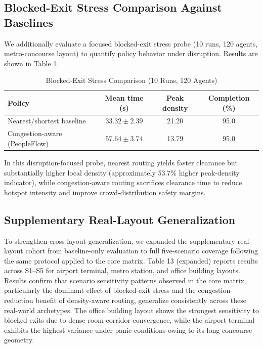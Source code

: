 \documentclass[journal]{IEEEtran}
\begin{document}
\subsection{Blocked-Exit Stress Comparison Against Baselines}
We additionally evaluate a focused blocked-exit stress probe (10 runs, 120 agents, metro-concourse layout) to quantify policy behavior under disruption. Results are shown in Table \ref{tab:blocked_policy_comparison}.

\begin{table}[!htbp]
\centering
\caption{Blocked-Exit Stress Comparison (10 Runs, 120 Agents)}
\label{tab:blocked_policy_comparison}
{\footnotesize
\setlength{\tabcolsep}{3pt}
\begin{tabular}{>{\raggedright\arraybackslash}p{2.2cm}ccc}
\toprule
\textbf{Policy} & \textbf{Mean time (s)} & \textbf{Peak density} & \textbf{Completion (\%)} \\
\midrule
Nearest/shortest baseline & $33.32 \pm 2.39$ & 21.20 & 95.0 \\
Congestion-aware (PeopleFlow) & $57.64 \pm 3.74$ & 13.79 & 95.0 \\
\bottomrule
\end{tabular}
}
\end{table}

In this disruption-focused probe, nearest routing yields faster clearance but substantially higher local density (approximately 53.7\% higher peak-density indicator), while congestion-aware routing sacrifices clearance time to reduce hotspot intensity and improve crowd-distribution safety margins.

\subsection{Supplementary Real-Layout Generalization}
To strengthen cross-layout generalization, we expanded the supplementary real-layout cohort from baseline-only evaluation to full five-scenario coverage following the same protocol applied to the core matrix. Table 13 (expanded) reports results across S1--S5 for airport terminal, metro station, and office building layouts. Results confirm that scenario sensitivity patterns observed in the core matrix, particularly the dominant effect of blocked-exit stress and the congestion-reduction benefit of density-aware routing, generalize consistently across these real-world archetypes. The office building layout shows the strongest sensitivity to blocked exits due to dense room-corridor convergence, while the airport terminal exhibits the highest variance under panic conditions owing to its long concourse geometry.
\end{document}
